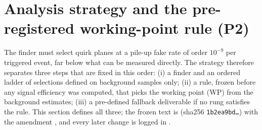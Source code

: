 \section{Analysis strategy and the pre-registered working-point rule (P2)}\label{sec:strategy}

The finder must select quirk planes at a pile-up fake rate of order $10^{-9}$ per triggered event, far below what can be
measured directly. The strategy therefore separates three steps that are fixed in this order: (i) a finder and an ordered
ladder of selections defined on background samples only; (ii) a rule, frozen before any signal efficiency was computed,
that picks the working point (WP) from the background estimates; (iii) a pre-defined fallback deliverable if no rung
satisfies the rule. This section defines all three; the frozen text is  (sha256
\texttt{1b2ea9bd\ldots}) with the amendment , and every later change is logged in
.

